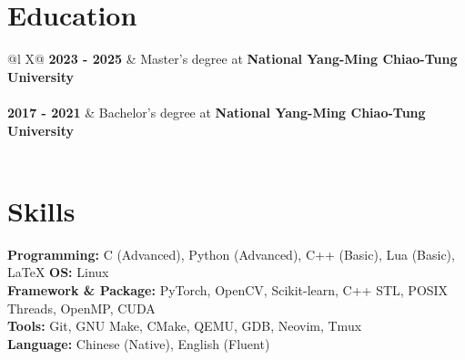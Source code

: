 \documentclass[a4paper,12pt]{article}
\begin{document}
\section{Education}
\begin{tabularx}{\linewidth}{@{}l X@{}}	
\textbf{2023 - 2025} & Master's degree at \textbf{National Yang-Ming Chiao-Tung University} \\%
  \\[3.75pt]

\textbf{2017 - 2021} & Bachelor's degree at \textbf{National Yang-Ming Chiao-Tung University} \\%
  \\ 
\end{tabularx}


\section{Skills}

\fontsize{10pt}{14pt}\selectfont
\noindent \textbf{Programming:} C (Advanced), Python (Advanced), C++ (Basic), Lua (Basic), \LaTeX \hspace{0.5cm} \textbf{OS:} Linux \\ [0.08cm]
\textbf{Framework \& Package:} PyTorch, OpenCV, Scikit-learn, C++ STL, POSIX Threads, OpenMP, CUDA \\ [0.08cm]
\textbf{Tools:} Git, GNU Make, CMake, QEMU, GDB, Neovim, Tmux \\ [0.08cm]
\textbf{Language:} Chinese (Native), English (Fluent)

\vfill
{}
\end{document}
